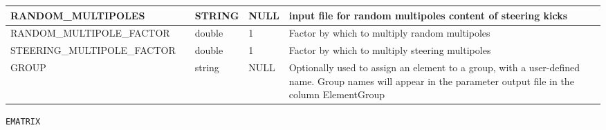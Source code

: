 \begin{tabular}{|l|l|l|l|p{\descwidth}|}
RANDOM\_MULTIPOLES &  & STRING &   NULL            & input file for random multipoles content of steering kicks  \\ \hline 
RANDOM\_MULTIPOLE\_FACTOR &  & double &   1 & Factor by which to multiply random multipoles  \\ \hline 
STEERING\_MULTIPOLE\_FACTOR &  & double &   1 & Factor by which to multiply steering multipoles  \\ \hline 
GROUP &  & string & NULL & Optionally used to assign an element to a group, with a user-defined name.  Group names will appear in the parameter output file in the column ElementGroup  \\ \hline 
\end{tabular}

\vspace*{0.5in}

\newpage
\begin{center}{\Large\verb|EMATRIX|}\end{center}
